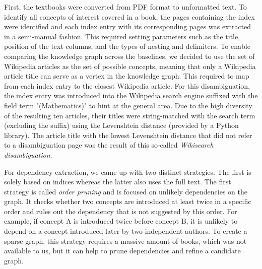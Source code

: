\documentclass{article}
\begin{document}
First, the textbooks were converted from PDF format to unformatted text. To identify all concepts of interest covered in a book, the pages containing the index were identified and each index entry with its corresponding pages was extracted in a semi-manual fashion. This required setting parameters such as the title, position of the text columns, and the types of nesting and delimiters. To enable comparing the knowledge graph across the baselines, we decided to use the set of Wikipedia articles as the set of possible concepts, meaning that only a Wikipedia article title can serve as a vertex in the knowledge graph. This required to map from each index entry to the closest Wikipedia article. For this disambiguation, the index entry was introduced into the Wikipedia search engine suffixed with the field term "(Mathematics)" to hint at the general area. Due to the high diversity of the resulting ten articles, their titles were string-matched with the search term (excluding the suffix) using the Levenshtein distance (provided by a Python library). The article title with the lowest Levenshtein distance that did not refer to a disambiguation page was the result of this so-called \textit{Wikisearch disambiguation}.


For dependency extraction, we came up with two distinct strategies.
The first is solely based on indices whereas the latter also uses the full text. The first strategy is called \textit{order pruning} and is focused on unlikely dependencies on the graph. It checks whether two concepts are introduced at least twice in a specific order and rules out the dependency that is not suggested by this order. For example, if concept A is introduced twice before concept B, it is unlikely to depend on a concept introduced later by two independent authors. To create a sparse graph, this strategy requires a massive amount of books, which was not available to us, but it can help to prune dependencies and refine a candidate graph.
\end{document}
